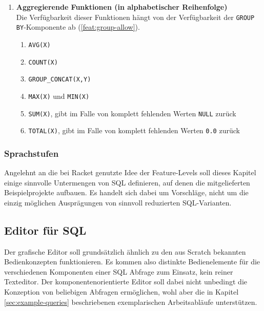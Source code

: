 \begin{enumerate}
\item \textbf{Aggregierende Funktionen (in alphabetischer Reihenfolge)} \\
  Die Verfügbarkeit dieser Funktionen hängt von der Verfügbarkeit der \texttt{GROUP BY}-Komponente ab (\ref{feat:group-allow}).
  \begin{enumerate}
  \item \label{feat:fun-avg} \texttt{AVG(X)}
  \item \label{feat:fun-count} \texttt{COUNT(X)}
  \item \label{feat:fun-group-concat} \texttt{GROUP\_CONCAT(X,Y)}
  \item \label{feat:fun-max-min} \texttt{MAX(X)} und \texttt{MIN(X)}
  \item \label{feat:fun-sum} \texttt{SUM(X)}, gibt im Falle von komplett fehlenden Werten \texttt{NULL} zurück
  \item \label{feat:fun-total} \texttt{TOTAL(X)}, gibt im Falle von komplett fehlenden Werten \texttt{0.0} zurück
  \end{enumerate}
\end{enumerate}

\subsubsection{Sprachstufen}
\label{sec:sql-subset-ranks}

Angelehnt an die bei Racket genutzte Idee der Feature-Levels soll dieses Kapitel einige sinnvolle Untermengen von SQL definieren, auf denen die mitgelieferten Beispielprojekte aufbauen. Es handelt sich dabei um Vorschläge, nicht um die einzig möglichen Ausprägungen von sinnvoll reduzierten SQL-Varianten.



\subsection{Editor für SQL}
\label{sec:design-sql-editor}

Der grafische Editor soll grundsätzlich ähnlich zu den aus Scratch bekannten Bedienkonzepten funktionieren. Es kommen also distinkte Bedienelemente für die verschiedenen Komponenten einer SQL Abfrage zum Einsatz, kein reiner Texteditor. Der komponentenorientierte Editor soll dabei nicht unbedingt die Konzeption von beliebigen Abfragen ermöglichen, wohl aber die in Kapitel \ref{sec:example-queries}  beschriebenen exemplarischen Arbeitsabläufe unterstützen. 

